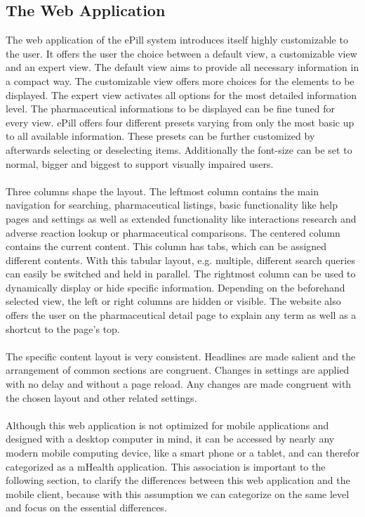 \subsection{The Web Application}
The web application of the ePill system introduces itself highly customizable to the user. It offers the user the choice between a default view, a customizable view and an expert view. The default view aims to provide all necessary information in a compact way. The customizable view offers more choices for the elements to be displayed. The expert view activates all options for the most detailed information level. The pharmaceutical informations to be displayed can be fine tuned for every view. ePill offers four different presets varying from only the most basic up to all available information. These presets can be further customized by afterwards selecting or deselecting items. Additionally the font-size can be set to normal, bigger and biggest to support visually impaired users.
\\
\\
Three columns shape the layout. The leftmost column contains the main navigation for searching, pharmaceutical listings, basic functionality like help pages and settings as well as extended functionality like interactions research and adverse reaction lookup or pharmaceutical comparisons. The centered column contains the current content. This column has tabs, which can be assigned different contents. With this tabular layout, e.g. multiple, different search queries can easily be switched and held in parallel. The rightmost column can be used to dynamically display or hide specific information. Depending on the beforehand selected view, the left or right columns are hidden or visible. The website also offers the user on the pharmaceutical detail page to explain any term as well as a shortcut to the page's top.
\\
\\
The specific content layout is very consistent. Headlines are made salient and the arrangement of common sections are congruent. Changes in settings are applied with no delay and without a page reload. Any changes are made congruent with the chosen layout and other related settings.
\\
\\
Although this web application is not optimized for mobile applications and designed with a desktop computer in mind, it can be accessed by nearly any modern mobile computing device, like a smart phone or a tablet, and can therefor categorized as a mHealth application. This association is important to the following section, to clarify the differences between this web application and the mobile client, because with this assumption we can categorize on the same level and focus on the essential differences.